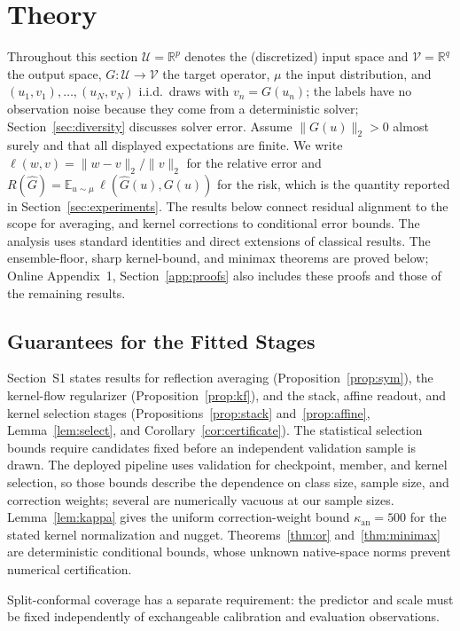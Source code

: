 \documentclass[twoside,11pt]{article}
\begin{document}
\section{Theory}
\label{sec:theory}
Throughout this section $\mathcal U=\mathbb R^p$ denotes the (discretized) input
space and $\mathcal V=\mathbb R^q$ the output space, $G:\mathcal U\to\mathcal V$
the target operator, $\mu$ the input distribution, and
$(u_1,v_1),\dots,(u_N,v_N)$ i.i.d.\ draws with $v_n=G(u_n)$; the labels have no
observation noise because they come from a deterministic solver;
Section~\ref{sec:diversity} discusses solver error. Assume $\|G(u)\|_2>0$ almost surely and that all displayed expectations are finite. We write
$\ell(w,v)=\|w-v\|_2/\|v\|_2$ for the relative error and
$R(\widehat G)=\mathbb E_{u\sim\mu}\,\ell(\widehat G(u),G(u))$ for the risk, which is
the quantity reported in Section~\ref{sec:experiments}. The results below connect
residual alignment to the scope for averaging, and kernel corrections to
conditional error bounds. The analysis uses standard identities and direct extensions
of classical results. The ensemble-floor, sharp kernel-bound, and minimax theorems are
proved below; Online Appendix~1, Section~\ref{app:proofs} also includes these proofs and
those of the remaining results.

\subsection{Guarantees for the Fitted Stages}
\label{sec:theory-stages-summary}

Section~S1 states results for reflection averaging
(Proposition~\ref{prop:sym}), the kernel-flow regularizer
(Proposition~\ref{prop:kf}), and the stack, affine readout, and kernel
selection stages (Propositions~\ref{prop:stack} and~\ref{prop:affine},
Lemma~\ref{lem:select}, and Corollary~\ref{cor:certificate}). The statistical
selection bounds require candidates fixed before an independent validation
sample is drawn. The deployed pipeline uses validation for checkpoint, member, and kernel
selection, so those bounds describe the dependence on class size, sample size, and correction
weights; several are numerically vacuous at our sample sizes.
Lemma~\ref{lem:kappa} gives the uniform correction-weight bound
$\kappa_{\mathrm{an}}=500$ for the stated kernel normalization and nugget.
Theorems~\ref{thm:or} and~\ref{thm:minimax} are deterministic conditional
bounds, whose unknown native-space norms prevent numerical certification.

Split-conformal coverage has a separate requirement: the predictor and
scale must be fixed independently of exchangeable calibration and
evaluation observations.
\end{document}
